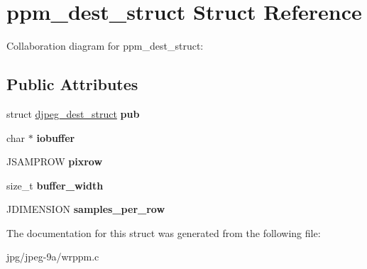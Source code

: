 \hypertarget{structppm__dest__struct}{\section{ppm\+\_\+dest\+\_\+struct Struct Reference}
\label{structppm__dest__struct}
}


Collaboration diagram for ppm\+\_\+dest\+\_\+struct\+:
\subsection*{Public Attributes}
\begin{DoxyCompactItemize}
\item 
\hypertarget{structppm__dest__struct_acfda871cae1828cd6c2612e272333f56}{struct \hyperlink{structdjpeg__dest__struct}{djpeg\+\_\+dest\+\_\+struct} {\bfseries pub}}\label{structppm__dest__struct_acfda871cae1828cd6c2612e272333f56}

\item 
\hypertarget{structppm__dest__struct_a9f27d256b175304136d5a6257a5ef9c6}{char $\ast$ {\bfseries iobuffer}}\label{structppm__dest__struct_a9f27d256b175304136d5a6257a5ef9c6}

\item 
\hypertarget{structppm__dest__struct_ac80b9359f9162965662d51d19c1a9a65}{J\+S\+A\+M\+P\+R\+O\+W {\bfseries pixrow}}\label{structppm__dest__struct_ac80b9359f9162965662d51d19c1a9a65}

\item 
\hypertarget{structppm__dest__struct_ab60e896a377d97b0aba94ea1d1d4506e}{size\+\_\+t {\bfseries buffer\+\_\+width}}\label{structppm__dest__struct_ab60e896a377d97b0aba94ea1d1d4506e}

\item 
\hypertarget{structppm__dest__struct_a165054eea68f98f1dda6cee05f6dfc3a}{J\+D\+I\+M\+E\+N\+S\+I\+O\+N {\bfseries samples\+\_\+per\+\_\+row}}\label{structppm__dest__struct_a165054eea68f98f1dda6cee05f6dfc3a}

\end{DoxyCompactItemize}


The documentation for this struct was generated from the following file\+:\begin{DoxyCompactItemize}
\item 
jpg/jpeg-\/9a/wrppm.\+c\end{DoxyCompactItemize}
